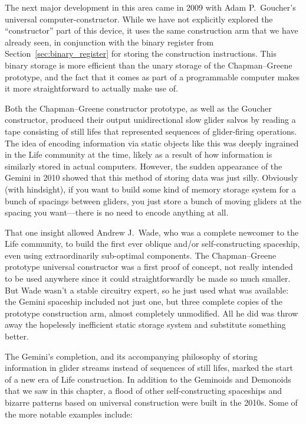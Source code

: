 The next major development in this area came in 2009 with Adam P.~Goucher's universal computer-constructor. While we have not explicitly explored the ``constructor'' part of this device, it uses the same construction arm that we have already seen, in conjunction with the binary register from Section~\ref{sec:binary_register} for storing the construction instructions. This binary storage is more efficient than the unary storage of the Chapman--Greene prototype, and the fact that it comes as part of a programmable computer makes it more straightforward to actually make use of.

Both the Chapman--Greene constructor prototype, as well as the Goucher constructor, produced their output unidirectional slow glider salvos by reading a tape consisting of still lifes that represented sequences of glider-firing operations. The idea of encoding information via static objects like this was deeply ingrained in the Life community at the time, likely as a result of how information is similarly stored in actual computers. However, the sudden appearance of the Gemini in 2010 showed that this method of storing data was just silly. Obviously (with hindsight), if you want to build some kind of memory storage system for a bunch of spacings between gliders, you just store a bunch of moving gliders at the spacing you want---there is no need to encode anything at all.

That one insight allowed Andrew J.~Wade, who was a complete newcomer to the Life community, to build the first ever oblique and/or self-constructing spaceship, even using extraordinarily sub-optimal components. The Chapman--Greene prototype universal constructor was a first proof of concept, not really intended to be used anywhere since it could straightforwardly be made so much smaller. But Wade wasn't a stable circuitry expert, so he just used what was available: the Gemini spaceship included not just one, but three complete copies of the prototype construction arm, almost completely unmodified. All he did was throw away the hopelessly inefficient static storage system and substitute something better.

The Gemini's completion, and its accompanying philosophy of storing information in glider streams instead of sequences of still lifes, marked the start of a new era of Life construction. In addition to the Geminoids and Demonoids that we saw in this chapter, a flood of other self-constructing spaceships and bizarre patterns based on universal construction were built in the 2010s. Some of the more notable examples include:\smallskip

